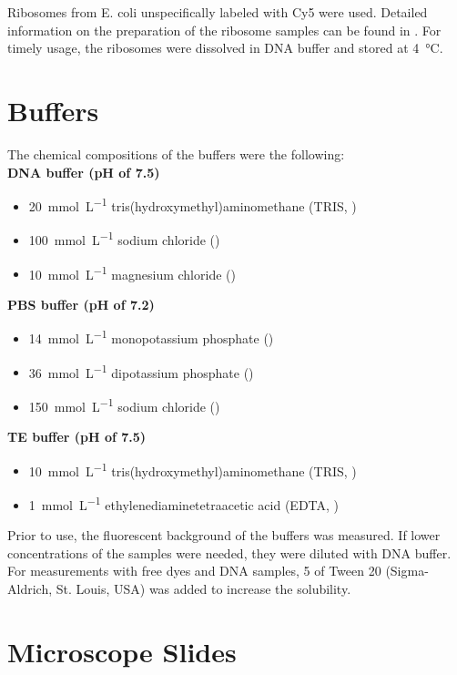 Ribosomes from E. coli unspecifically labeled with Cy5 were used. Detailed information on the preparation of the ribosome samples can be found in \cite{Hoefig2019b}. For timely usage, the ribosomes were dissolved in DNA buffer and stored at \SI{4}{\celsius}.

\section{Buffers}

The chemical compositions of the buffers were the following:\\

\textbf{DNA buffer (pH of \num{7.5})}
\begin{itemize}
	\item \SI{20}{\milli\mole\per\liter} tris(hydroxymethyl)aminomethane (TRIS, )
	\item \SI{100}{\milli\mole\per\liter} sodium chloride ()
	\item \SI{10}{\milli\mole\per\liter} magnesium chloride ()\\
\end{itemize}
\clearpage
\textbf{PBS buffer (pH of \num{7.2})}
\begin{itemize}
	\item \SI{14}{\milli\mole\per\liter} monopotassium phosphate ()
	\item \SI{36}{\milli\mole\per\liter} dipotassium phosphate ()
	\item \SI{150}{\milli\mole\per\liter} sodium chloride ()
\end{itemize}
\textbf{TE buffer (pH of \num{7.5})}
\begin{itemize}
	\item \SI{10}{\milli\mole\per\liter} tris(hydroxymethyl)aminomethane (TRIS, )
	\item \SI{1}{\milli\mole\per\liter} ethylenediaminetetraacetic acid (EDTA, )
\end{itemize}

Prior to use, the fluorescent background of the buffers was measured. If lower concentrations of the samples were needed, they were diluted with DNA buffer. For measurements with free dyes and DNA samples, \SI{5}{\volpercent} of Tween 20 (Sigma-Aldrich, St. Louis, USA) was added to increase the solubility. 

\section{Microscope Slides}

